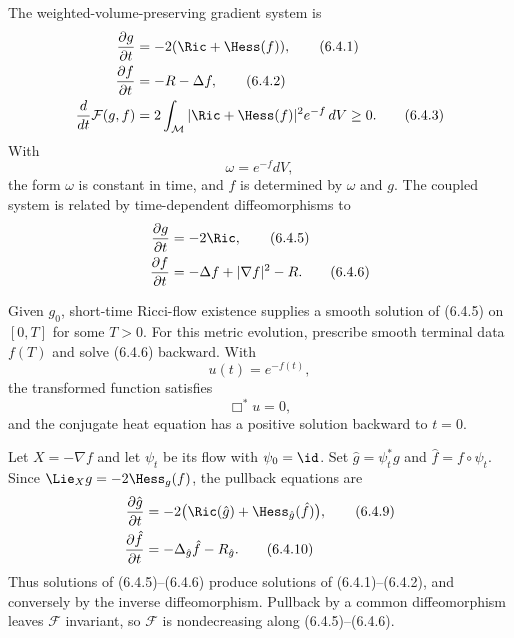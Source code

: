 The weighted-volume-preserving gradient system is
\begin{align}
\frac{\partial g}{\partial t}&=-2(\Ric+\Hess(f)), \tag{6.4.1}\\
\frac{\partial f}{\partial t}&=-R-\Delta f, \tag{6.4.2}\\
\frac{d}{dt}\mathcal F(g,f)&=2\int_{\mathcal M}|\Ric+\Hess(f)|^2e^{-f}\,dV\geq0. \tag{6.4.3}
\end{align}
With
\begin{equation}
\omega=e^{-f}dV, \tag{6.4.4}
\end{equation}
the form $\omega$ is constant in time, and $f$ is determined by $\omega$ and
$g$. The coupled system is related by time-dependent diffeomorphisms to
\begin{align}
\frac{\partial g}{\partial t}&=-2\Ric, \tag{6.4.5}\\
\frac{\partial f}{\partial t}&=-\Delta f+|\nabla f|^2-R. \tag{6.4.6}
\end{align}

Given $g_0$, short-time Ricci-flow existence supplies a smooth solution of
(6.4.5) on $[0,T]$ for some $T>0$. For this metric evolution, prescribe
smooth terminal data $f(T)$ and solve (6.4.6) backward. With
\begin{equation}
u(t)=e^{-f(t)}, \tag{6.4.7}
\end{equation}
the transformed function satisfies
\begin{equation}
\Box^*u=0, \tag{6.4.8}
\end{equation}
and the conjugate heat equation has a positive solution backward to $t=0$.

Let $X=-\nabla f$ and let $\psi_t$ be its flow with $\psi_0=\id$.
Set $\hat g=\psi_t^*g$ and $\hat f=f\circ\psi_t$. Since
$\Lie_Xg=-2\Hess_g(f)$, the pullback equations are
\begin{align}
\frac{\partial\hat g}{\partial t}
&=-2\bigl(\Ric(\hat g)+\Hess_{\hat g}(\hat f)\bigr), \tag{6.4.9}\\
\frac{\partial\hat f}{\partial t}
&=-\Delta_{\hat g}\hat f-R_{\hat g}. \tag{6.4.10}
\end{align}
Thus solutions of (6.4.5)--(6.4.6) produce solutions of (6.4.1)--(6.4.2),
and conversely by the inverse diffeomorphism. Pullback by a common
diffeomorphism leaves $\mathcal F$ invariant, so $\mathcal F$ is
nondecreasing along (6.4.5)--(6.4.6).

